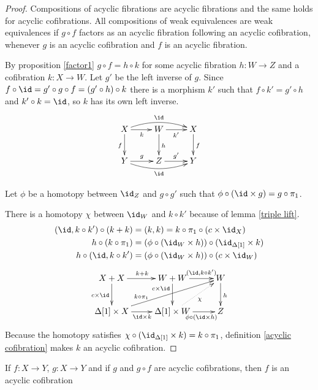 \documentclass{tac}
\newcommand\hide[1]{}
\newcommand\of{:}
\newcommand\simplex\Delta
\begin{document}
\begin{proof} Compositions of acyclic fibrations are acyclic fibrations and the same holds for acyclic cofibrations. \hide{last part is no longer obvious}
All compositions of weak equivalences are weak equivalences if $g\circ f$ factors as an acyclic fibration following an acyclic cofibration, whenever $g$ is an acyclic cofibration and $f$ is an acyclic fibration.

By proposition \ref{factor1} $g\circ f=h\circ k$ for some acyclic fibration $h\of W\to Z$ and a cofibration $k\of X\to W$. Let $g'$ be the left inverse of $g$. Since $f \circ \id = g'\circ g\circ f= (g'\circ h)\circ k$ there is a morphism $k'$ such that $f\circ k' = g'\circ h$ and $k'\circ k = \id$, so $k$ has its own left inverse.
\[\xymatrix{
X\ar[d]_f \ar[r]_{k} \ar@/^2ex/[rr]^{\id} & W\ar[d]^h \ar[r]_{k'} & X\ar[d]^f\\
Y \ar[r]^{g} \ar@/_2ex/[rr]_{\id} & Z \ar[r]^{g'} & Y
}\]

Let $\phi$ be a homotopy between $\id_Z$ and $g\circ g'$ such that $\phi\circ (\id\times g)=g\circ\pi_1$.

There is a homotopy $\chi$ between $\id_W$ and $k\circ k'$ because of lemma \ref{triple lift}.
\begin{align*}
(\id, k\circ k')\circ (k+k) &= (k,k) = k\circ \pi_1\circ(c\times\id_X)\\
h\circ (k \circ \pi_1) &= (\phi\circ (\id_W\times h))\circ (\id_{\simplex[1]} \times k)\\
h\circ (\id, k\circ k') &= (\phi\circ (\id_W\times h))\circ (c\times \id_W)
\end{align*}
\[\xymatrix{
X+X\ar[d]_{c\times \id}\ar[r]^{k+k} & W+W\ar[d]_(.3){c\times \id}\ar[r]^(.6){(\id,k\circ k')} & W\ar[d]^h\\
\simplex[1]\times X\ar[r]_{\id\times k} \ar[urr]^(.3){k\circ \pi_1}  & \simplex[1]\times W\ar[r]_(.6){\phi\circ (\id\times h)} \ar@{.>}[ur]_\chi & Z
}\]
Because the homotopy satisfies $\chi\circ(\id_{\simplex[1]}\times k) = k\circ \pi_1$, definition \ref{acyclic cofibration} makes $k$ an acyclic cofibration.

\end{proof}

\begin{lemma} If $f\of X\to Y$, $g\of X\to Y$ and if $g$ and $g\circ f$ are acyclic cofibrations, then $f$ is an acyclic cofibration \label{left cancellation} \end{lemma}
\end{document}
